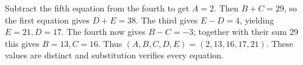 Subtract the fifth equation from the fourth to get $ A=2 $. Then $ B+C=29 $, so the first equation gives $ D+E=38 $. The third gives $ E-D=4 $, yielding $ E=21,D=17 $. The fourth now gives $ B-C=-3 $; together with their sum 29 this gives $ B=13,C=16 $. Thus $\boxed{(A,B,C,D,E)=(2,13,16,17,21)}$. These values are distinct and substitution verifies every equation.

